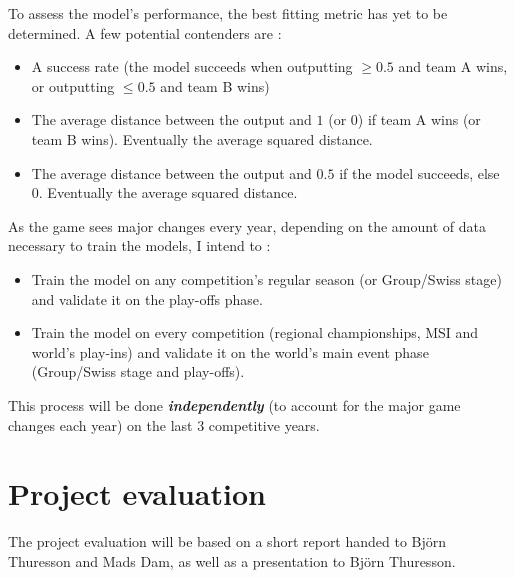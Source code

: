 \documentclass{article}
\begin{document}
To assess the model's performance, the best fitting metric has yet to be determined. A few potential contenders are :
\begin{itemize}
    \item A success rate (the model succeeds when outputting $\geq0.5$ and team A wins, or outputting $\leq0.5$ and team B wins)
    \item The average distance between the output and $1$ (or $0$) if team A wins (or team B wins). Eventually the average squared distance.
    \item The average distance between the output and $0.5$ if the model succeeds, else 0. Eventually the average squared distance.
\end{itemize}

As the game sees major changes every year, depending on the amount of data necessary to train the models, I intend to :
\begin{itemize}
    \item Train the model on any competition's regular season (or Group/Swiss stage) and validate it on the play-offs phase.
    \item Train the model on every competition (regional championships, MSI and world's play-ins) and validate it on the world's main event phase (Group/Swiss stage and play-offs).
\end{itemize}
This process will be done \textbf{\textit{independently}} (to account for the major game changes each year) on the last 3 competitive years.

\section{Project evaluation}

The project evaluation will be based on a short report handed to Björn Thuresson and Mads Dam, as well as a presentation to Björn Thuresson.
\end{document}
